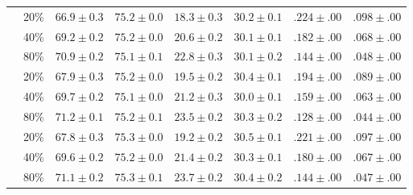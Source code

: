 \begin{center}
\begin{longtable}{llrrrrrr}
\midrule
\multirow{3}{*}{\sla{}} & 20\% & $66.9\pm0.3$ & $75.2\pm0.0$ & $18.3\pm0.3$ & $30.2\pm0.1$ & $.224\pm.00$ & $.098\pm.00$ \\
                        & 40\% & $69.2\pm0.2$ & $75.2\pm0.0$ & $20.6\pm0.2$ & $30.1\pm0.1$ & $.182\pm.00$ & $.068\pm.00$ \\
                        & 80\% & $70.9\pm0.2$ & $75.1\pm0.1$ & $22.8\pm0.3$ & $30.1\pm0.2$ & $.144\pm.00$ & $.048\pm.00$ \\
\midrule
\multirow{3}{*}{\epi{}} & 20\% & $67.9\pm0.3$ & $75.2\pm0.0$ & $19.5\pm0.2$ & $30.4\pm0.1$ & $.194\pm.00$ & $.089\pm.00$ \\
                        & 40\% & $69.7\pm0.2$ & $75.1\pm0.0$ & $21.2\pm0.3$ & $30.0\pm0.1$ & $.159\pm.00$ & $.063\pm.00$ \\
                        & 80\% & $71.2\pm0.1$ & $75.2\pm0.1$ & $23.5\pm0.2$ & $30.3\pm0.2$ & $.128\pm.00$ & $.044\pm.00$ \\
\midrule
\multirow{3}{*}{\kiw{}} & 20\% & $67.8\pm0.3$ & $75.3\pm0.0$ & $19.2\pm0.2$ & $30.5\pm0.1$ & $.221\pm.00$ & $.097\pm.00$ \\
                        & 40\% & $69.6\pm0.2$ & $75.2\pm0.0$ & $21.4\pm0.2$ & $30.3\pm0.1$ & $.180\pm.00$ & $.067\pm.00$ \\
                        & 80\% & $71.1\pm0.2$ & $75.3\pm0.1$ & $23.7\pm0.2$ & $30.4\pm0.2$ & $.144\pm.00$ & $.047\pm.00$ \\
    \bottomrule
  \end{longtable}
\end{center}
